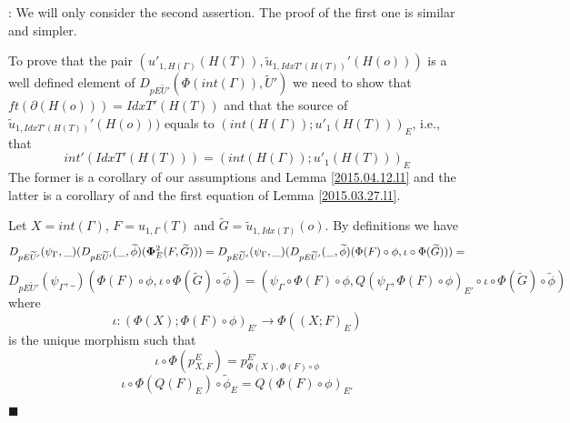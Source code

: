 \documentclass[12pt]{article}
\numberwithin{equation}{section}
\newenvironment{myproof}{{\bf Proof}:}{$\blacksquare$ \vskip 5mm }
\newcommand{\sr}{\rightarrow}
\newcommand{\wt}{\widetilde}
\begin{document}
\begin{myproof}
We will only consider the second assertion. The proof of the first one is
similar and simpler.

To prove that the pair $(u'_{1,H(\Gamma)}(H(T)),
\wt{u}_{1,IdxT'(H(T))}'(H(o)))$ is a well defined element of
$D_{pE\wt{U}'}(\Phi(int(\Gamma)),\wt{U}')$ we need to show that
$ft(\partial(H(o)))=IdxT'(H(T))$ and that the source of
$\wt{u}_{1,IdxT'(H(T))}'(H(o)))$ equals to $(int(H(\Gamma)); u'_1(H(T)))_{E}$,
i.e., that
%
$$int'(IdxT'(H(T)))=(int(H(\Gamma)); u'_1(H(T)))_{E}$$
%
The former is a corollary of our assumptions and Lemma \ref{2015.04.12.l1} and
the latter is a corollary of \cite[Problem 3.3(1)]{fromunivwithPi} and the
first equation of Lemma \ref{2015.03.27.l1}.

Let $X=int(\Gamma)$, $F=u_{1,\Gamma}(T)$ and $\wt{G}=\wt{u}_{1,Idx(T)}(o)$. By
definitions we have
%
$$D_{pE\wt{U}'}(\psi_{\Gamma},\_)(D_{pE\wt{U}'}(\_,\wt{\phi})({\bf\Phi}_{E}^2(F,\wt{G})))=D_{pE\wt{U}'}(\psi_{\Gamma},\_)(D_{pE\wt{U}'}(\_,\wt{\phi})(\Phi(F)\circ
\phi, \iota\circ \Phi(\wt{G})))=$$
$$D_{pE\wt{U}'}(\psi_{\Gamma},\_)(\Phi(F)\circ \phi, \iota\circ
\Phi(\wt{G})\circ\wt{\phi})=(\psi_{\Gamma}\circ\Phi(F)\circ \phi,
Q(\psi_{\Gamma},\Phi(F)\circ\phi)_{E'}\circ\iota\circ
\Phi(\wt{G})\circ\wt{\phi})$$
%
where
%
$$\iota:(\Phi(X);\Phi(F)\circ \phi)_{E'}\sr \Phi((X;F)_{E})$$
%
is the unique morphism such that
%
$$\iota\circ \Phi(p^E_{X,F})=p^{E'}_{\Phi(X),\Phi(F)\circ\phi}$$
$$\iota\circ \Phi(Q(F)_E)\circ \wt{\phi}_E=Q(\Phi(F)\circ\phi)_{E'}$$
%


\end{myproof}
\end{document}
